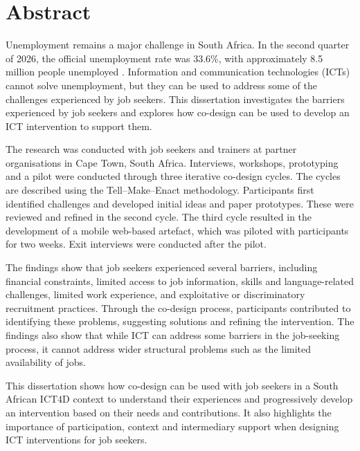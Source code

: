 \chapter*{Abstract}
\thispagestyle{plain}

Unemployment remains a major challenge in South Africa. In the second
quarter of 2026, the official unemployment rate was 33.6\%, with
approximately 8.5 million people unemployed \cite{statssa2026}.
Information and communication technologies (ICTs) cannot solve unemployment,
but they can be used to address some of the challenges experienced by job
seekers. This dissertation investigates the barriers experienced by job
seekers and explores how co-design can be used to develop an ICT intervention
to support them.

The research was conducted with job seekers and trainers at partner
organisations in Cape Town, South Africa. Interviews, workshops, prototyping
and a pilot were conducted through three iterative co-design cycles. The
cycles are described using the Tell--Make--Enact methodology. Participants first identified
challenges and developed initial ideas and paper prototypes. These were
reviewed and refined in the second cycle. The third cycle resulted in the
development of a mobile web-based artefact, which was piloted with
participants for two weeks. Exit interviews were conducted after the pilot.

The findings show that job seekers experienced several barriers, including
financial constraints, limited access to job information, skills and
language-related challenges, limited work experience, and exploitative or
discriminatory recruitment practices. Through the co-design process,
participants contributed to identifying these problems, suggesting solutions
and refining the intervention. The findings also show that while ICT can
address some barriers in the job-seeking process, it cannot address wider
structural problems such as the limited availability of jobs.

This dissertation shows how co-design can be used with job seekers in a
South African ICT4D context to understand their experiences and progressively
develop an intervention based on their needs and contributions. It also
highlights the importance of participation, context and intermediary support
when designing ICT interventions for job seekers.